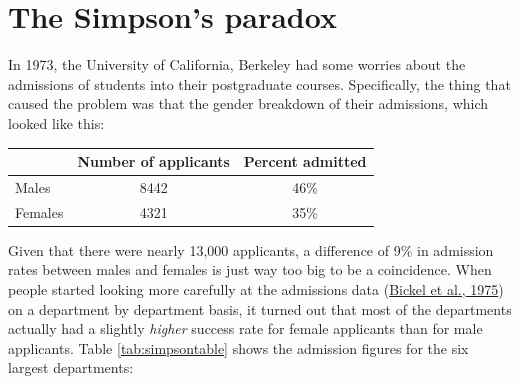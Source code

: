 \documentclass[
]{book}
\theoremstyle{definition}
\theoremstyle{definition}
\theoremstyle{definition}
\theoremstyle{definition}
\theoremstyle{remark}
\begin{document}
\hypertarget{the-simpsons-paradox}{%
\section{The Simpson's paradox}\label{the-simpsons-paradox}}

In 1973, the University of California, Berkeley had some worries about the admissions of students into their postgraduate courses. Specifically, the thing that caused the problem was that the gender breakdown of their admissions, which looked like this:

\begin{table}[H]
\centering
\begin{tabular}{lcc}
\toprule
  & Number of applicants & Percent admitted\\
\midrule
Males & 8442 & 46\%\\
Females & 4321 & 35\%\\
\bottomrule
\end{tabular}
\end{table}

Given that there were nearly 13,000 applicants, a difference of 9\% in admission rates between males and females is just way too big to be a coincidence. When people started looking more carefully at the admissions data (\protect\hyperlink{ref-Bickel1975}{Bickel et al., 1975}) on a department by department basis, it turned out that most of the departments actually had a slightly \emph{higher} success rate for female applicants than for male applicants. Table \ref{tab:simpsontable} shows the admission figures for the six largest departments:

\begin{table}[H]

\caption{\label{tab:simpsontable}Admission figures for the six largest departments by gender}
\centering
{}
\end{table}
\end{document}
